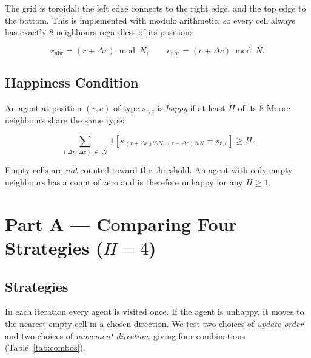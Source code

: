 \documentclass[11pt, a4paper]{article}
\begin{document}
The grid is toroidal: the left edge connects to the right edge, and the top edge to the
bottom. This is implemented with modulo arithmetic, so every cell always has exactly
8 neighbours regardless of its position:

\begin{equation}
  r_{\text{nbr}} = (r + \Delta r) \bmod N,
  \qquad
  c_{\text{nbr}} = (c + \Delta c) \bmod N.
  \label{eq:pbc}
\end{equation}

\subsection{Happiness Condition}

An agent at position $(r, c)$ of type $s_{r,c}$ is \emph{happy} if at least $H$ of its
8 Moore neighbours share the same type:

\begin{equation}
  \sum_{(\Delta r,\,\Delta c)\;\in\;\mathcal{N}}
  \mathbf{1}\!\left[s_{\,(r+\Delta r)\%N,\,(c+\Delta c)\%N} = s_{r,c}\right] \geq H.
  \label{eq:happy}
\end{equation}

Empty cells are \emph{not} counted toward the threshold. An agent with only empty
neighbours has a count of zero and is therefore unhappy for any $H \geq 1$.

\section{Part A --- Comparing Four Strategies ($H = 4$)}

\subsection{Strategies}

In each iteration every agent is visited once.
If the agent is unhappy, it moves to the nearest empty cell in a chosen direction.
We test two choices of \emph{update order} and two choices of \emph{movement direction},
giving four combinations (Table~\ref{tab:combos}).
\end{document}
